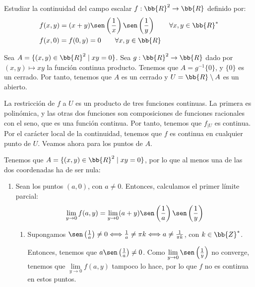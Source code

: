 \begin{ejercicio}
    Estudiar la continuidad del campo escalar $f : \bb{R}^2 \to \bb{R}$ definido por:
    \begin{equation*}\begin{split}
        &f(x,y) = (x+y)\sen\left(\frac{1}{x}\right)\sen\left(\frac{1}{y}\right) \qquad \forall x,y\in \bb{R}^\ast \\
        &f(x,0)=f(0,y)=0 \qquad \forall x,y\in \bb{R}
    \end{split}\end{equation*}

    

    Sea $A=\{(x,y)\in\bb{R}^2 \mid xy=0\}$. Sea $g:\bb{R}^2\to \bb{R}$ dado por $(x,y)\mapsto xy$ la función continua producto. Tenemos que $A=g^{-1}\{0\}$, y $\{0\}$ es un cerrado. Por tanto, tenemos que $A$ es un cerrado y $U=\bb{R}\setminus A$ es un abierto.
    
    La restricción de $f$ a $U$ es un producto de tres funciones continuas. La primera es polinómica, y las otras dos funciones son composiciones de funciones racionales con el seno, que es una función continua. Por tanto, tenemos que $f_{\big|U}$ es continua. Por el carácter local de la continuidad, tenemos que $f$ es continua en cualquier punto de $U$. Veamos ahora para los puntos de $A$.

    Tenemos que $A=\{(x,y)\in\bb{R}^2 \mid xy=0\}$, por lo que al menos una de las dos coordenadas ha de ser nula:
    \begin{enumerate}
        \item Sean los puntos $(a,0)$, con $a\neq 0$. Entonces, calculamos el primer límite parcial:
        \begin{equation*}
            \lim_{y\to 0}f(a,y)
            = \lim_{y\to 0} (a+y)\sen\left(\frac{1}{a}\right)\sen\left(\frac{1}{y}\right)
        \end{equation*}

        \begin{enumerate}
            \item Supongamos $\sen\left(\frac{1}{a}\right)\neq 0\Longleftrightarrow \frac{1}{a}\neq \pi k\Longleftrightarrow a\neq \frac{1}{\pi k}$, con $k\in \bb{Z}^\ast$.
            
            Entonces, tenemos que $a\sen\left(\frac{1}{a}\right)\neq 0$. Como $\lim\limits_{y\to 0}\sen\left(\frac{1}{y}\right)$ no converge, tenemos que $\lim\limits_{y\to 0}f(a,y)$ tampoco lo hace, por lo que $f$ no es continua en estos puntos.


\end{enumerate}
\end{enumerate}
\end{ejercicio}
